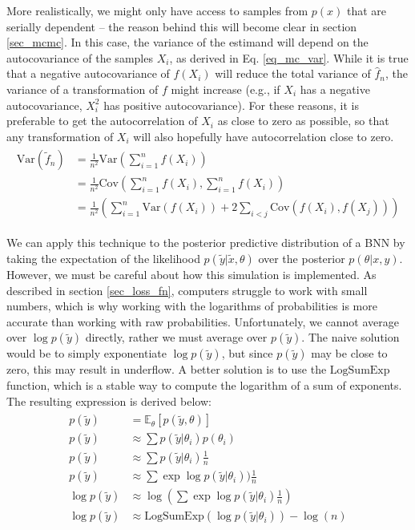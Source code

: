 \documentclass[12pt]{article}
\begin{document}
More realistically, we might only have access to samples from $p(x)$ that are serially dependent -- the reason behind this will become clear in section \ref{sec_mcmc}. In this case, the variance of the estimand will depend on the autocovariance of the samples $X_i$, as derived in Eq. \ref{eq_mc_var}. While it is true that a negative autocovariance of $f(X_i)$ will reduce the total variance of $\hat{f}_n$, the variance of a transformation of $f$ might increase (e.g., if $X_i$ has a negative autocovariance, $X_i^2$ has positive autocovariance). For these reasons, it is preferable to get the autocorrelation of $X_i$ as close to zero as possible, so that any transformation of $X_i$ will also hopefully have autocorrelation close to zero.
\begin{align}
\begin{split}
\text{Var} \left( \tilde{f}_n \right) &= \frac{1}{n^2} \text{Var} \left( \sum_{i=1}^n f(X_i)\right) \\
&= \frac{1}{n^2} \text{Cov} \left( \sum_{i=1}^n f\left(X_{i}\right), \sum_{i=1}^{n} f(X_{i})\right) \\
&=\frac{1}{n^2} \left (\sum_{i=1}^n \text{Var}(f(X_{i}))+2 \sum_{i<j} \text{Cov}(f(X_{i}), f(X_{j}))\right)
\end{split}
\label{eq_mc_var}
\end{align}

We can apply this technique to the posterior predictive distribution of a BNN by taking the expectation of the likelihood $p(\tilde{y}|\tilde{x},\theta)$ over the posterior $p(\theta|x,y)$. However, we must be careful about how this simulation is implemented. As described in section \ref{sec_loss_fn}, computers struggle to work with small numbers, which is why working with the logarithms of probabilities is more accurate than working with raw probabilities. Unfortunately, we cannot average over $\log p(\tilde{y})$ directly, rather we must average over $p(\tilde{y})$. The naive solution would be to simply exponentiate $\log p(\tilde{y})$, but since $p(\tilde{y})$ may be close to zero, this may result in underflow. A better solution is to use the $\textrm{LogSumExp}$ function, which is a stable way to compute the logarithm of a sum of exponents. The resulting expression is derived below:
\begin{align}
\begin{split}
p(\tilde{y}) &= \mathbb{E}_\theta [p(\tilde{y}, \theta)] \\
p(\tilde{y}) &\approx \sum p(\tilde{y}|\theta_i) p(\theta_i) \\
p(\tilde{y}) &\approx \sum p(\tilde{y}|\theta_i) \frac{1}{n} \\
p(\tilde{y}) &\approx \sum \exp \log p(\tilde{y}|\theta_i)) \frac{1}{n} \\
\log p(\tilde{y}) &\approx \log(\sum \exp \log p(\tilde{y}|\theta_i) \frac{1}{n}) \\
\log p(\tilde{y}) &\approx \textrm{LogSumExp} (\log p(\tilde{y}|\theta_i)) - \log(n)
\end{split}
\end{align}
\end{document}
